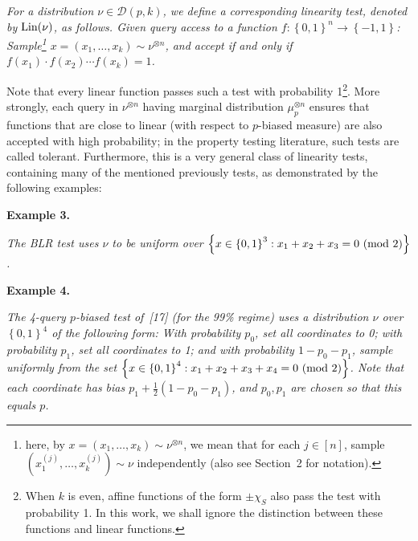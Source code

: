 \documentclass[10pt,a4paper]{article}
\begin{document}
\emph{For a distribution $\nu\in\mathcal{D}(p,k)$, we define a corresponding linearity test, denoted by $\textnormal{Lin}(\nu)$, as follows.
Given query access to a function $f:\left\{0,1\right\}^{n}\to\left\{-1,1\right\}$:
Sample\footnote{here, by $x=(x_{1},\dots,x_{k})\sim\nu^{\otimes n}$, we mean that for each $j\in[n]$, sample $(x_{1}^{\left(j\right)},\dots,x_{k}^{\left(j\right)})\sim\nu$ independently (also see Section 2 for notation).} $x=(x_{1},\dots,x_{k})\sim\nu^{\otimes n}$, and accept if and only if $f(x_{1})\cdot f(x_{2})\cdots f(x_{k})=1$.}\par







Note that every linear function passes such a test with probability 1\footnote{When $k$ is even, affine functions of the form $\pm\chi_{S}$ also pass the test with probability 1. In this work, we shall ignore the distinction between these functions and linear functions.}.
More strongly, each query in $\nu^{\otimes n}$ having marginal distribution $\mu_{p}^{\otimes n}$ ensures that functions that are close to linear (with respect to $p$-biased measure) are also accepted with high probability; in the property testing literature, such tests are called tolerant.
Furthermore, this is a very general class of linearity tests, containing many of the mentioned previously tests, as demonstrated by the following examples:\par





\par\medskip\noindent\textbf{
\textbf{Example 3}\textbf{.}
}\par



\emph{The BLR test uses $\nu$ to be uniform over ${\left\{x\in\left\{0,1\right\}^{3}:x_{1}+x_{2}+x_{3}=0\textnormal{ (mod 2)}\right\}}$.}\par







\par\medskip\noindent\textbf{
\textbf{Example 4}\textbf{.}
}\par



\emph{The 4-query $p$-biased test of [17] (for the 99\% regime) uses a distribution $\nu$ over $\left\{0,1\right\}^{4}$ of the following form:
With probability $p_{0}$, set all coordinates to 0; with probability $p_{1}$, set all coordinates to 1; and with probability $1-p_{0}-p_{1}$, sample uniformly from the set $\left\{x\in\left\{0,1\right\}^{4}:x_{1}+x_{2}+x_{3}+x_{4}=0\textnormal{ (mod 2)}\right\}$.
Note that each coordinate has bias $p_{1}+\frac{1}{2}\left(1-p_{0}-p_{1}\right)$, and $p_{0},p_{1}$ are chosen so that this equals $p$.}\par
\end{document}
